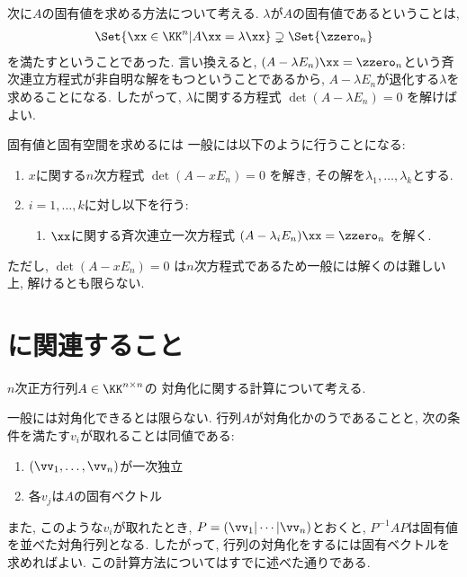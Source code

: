 次に$A$の固有値を求める方法について考える.
$\lambda$が$A$の固有値であるということは,
\begin{align*}
  \Set{\xx\in \KK^n|A\xx=\lambda\xx}\supsetneq \Set{\zzero_n}
\end{align*}
を満たすということであった.
言い換えると,
$(A-\lambda E_n)\xx=\zzero_n$という斉次連立方程式が非自明な解をもつということであるから,
$A-\lambda E_n$が退化する$\lambda$を求めることになる.
したがって,
$\lambda$に関する方程式
$\det(A-\lambda E_n)=0$
を解けばよい.

固有値と固有空間を求めるには
一般には以下のように行うことになる:
\begin{enumerate}
\item
  $x$に関する$n$次方程式
  $\det(A-x E_n)=0$
  を解き,
  その解を$\lambda_1,\ldots,\lambda_k$とする.
\item $i=1,\ldots,k$に対し以下を行う:
  \begin{enumerate}
  \item
    $\xx$に関する斉次連立一次方程式
    $(A-\lambda_i E_n)\xx=\zzero_n$
    を解く.
  \end{enumerate}
\end{enumerate}
ただし,
$\det(A-x E_n)=0$
は$n$次方程式であるため一般には解くのは難しい上, 解けるとも限らない.



\section{に関連すること}
$n$次正方行列$A\in\KK^{n\times n}$の
対角化に関する計算について考える.

一般には対角化できるとは限らない.
行列$A$が対角化かのうであることと,
次の条件を満たす$v_i$が取れることは同値である:
\begin{enumerate}
\item $(\vv_1,\ldots,\vv_n)$が一次独立
\item  各$v_j$は$A$の固有ベクトル
\end{enumerate}
また, このような$v_i$が取れたとき,
$P=(\vv_1|\cdots|\vv_n)$とおくと,
$P^{-1}AP$は固有値を並べた対角行列となる.
したがって, 行列の対角化をするには固有ベクトルを求めればよい.
この計算方法についてはすでに述べた通りである.

